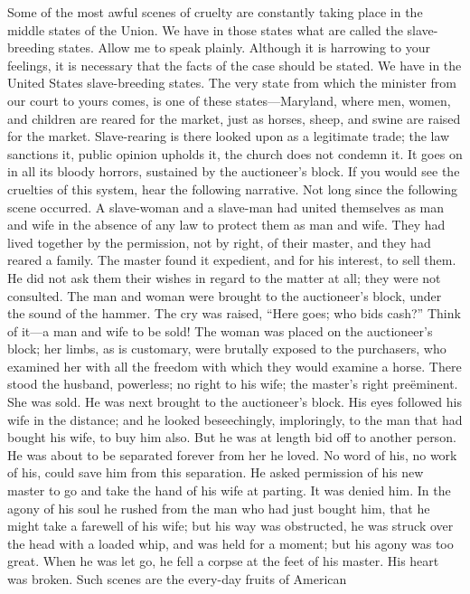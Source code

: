 Some of the most awful scenes of cruelty are constantly taking place in
the middle states of the Union. We have in those states what are called
the slave-breeding states. Allow me to speak plainly. Although it is
harrowing to your feelings, it is necessary
{\protect\hypertarget{412}{}{}}that the facts of the case should be
stated. We have in the United States slave-breeding states. The very
state from which the minister from our court to yours comes, is one of
these states---Maryland, where men, women, and children are reared for
the market, just as horses, sheep, and swine are raised for the market.
Slave-rearing is there looked upon as a legitimate trade; the law
sanctions it, public opinion upholds it, the church does not condemn it.
It goes on in all its bloody horrors, sustained by the auctioneer's
block. If you would see the cruelties of this system, hear the following
narrative. Not long since the following scene occurred. A slave-woman
and a slave-man had united themselves as man and wife in the absence of
any law to protect them as man and wife. They had lived together by the
permission, not by right, of their master, and they had reared a family.
The master found it expedient, and for his interest, to sell them. He
did not ask them their wishes in regard to the matter at all; they were
not consulted. The man and woman were brought to the auctioneer's block,
under the sound of the hammer. The cry was raised, ``Here goes; who bids
cash?'' Think of it---a man and wife to be sold! The woman was placed on
the auctioneer's block; her limbs, as is customary, were brutally
exposed to the purchasers, who examined her with all the freedom with
which they would examine a horse. There stood the husband, powerless; no
right to his wife; the master's right preëminent. She was sold. He was
next brought to the auctioneer's block. His eyes followed his wife in
the distance; and he looked beseechingly, imploringly, to the man that
had bought his wife, to buy him also. But he was at length bid off to
another person. He was about to be separated forever from her he loved.
No word of his, no work of his, could save him from this separation. He
asked permission of his new master to go and take the hand of his wife
at parting. It was denied him. In the agony of his soul he rushed from
the man who had just bought him, that he might take a farewell of his
wife; but his way was obstructed, he was struck over the head with a
loaded whip, and was held for a moment; but his agony was too great.
When he was let go, he fell a corpse at the feet of his master. His
heart was broken. Such scenes are the every-day fruits of American
